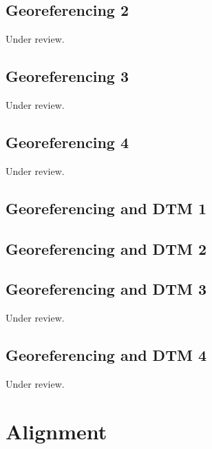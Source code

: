 \documentclass{scrartcl}
\begin{document}
\subsection{Georeferencing 2}
\label{sec:georeferencing_2}
Under review.%
\clearpage

\subsection{Georeferencing 3}
\label{sec:georeferencing_3}
Under review.%
\clearpage

\subsection{Georeferencing 4}
\label{sec:georeferencing_4}
Under review.%
\clearpage

\subsection{Georeferencing and DTM 1}
\label{sec:georef_tin_1}
\clearpage

\subsection{Georeferencing and DTM 2}
\label{sec:georef_tin_2}
\clearpage

\subsection{Georeferencing and DTM 3}
\label{sec:georef_tin_3}
Under review.%
\clearpage

\subsection{Georeferencing and DTM 4}
\label{sec:georef_tin_4}
Under review.%
\clearpage

\section{Alignment}
\end{document}
